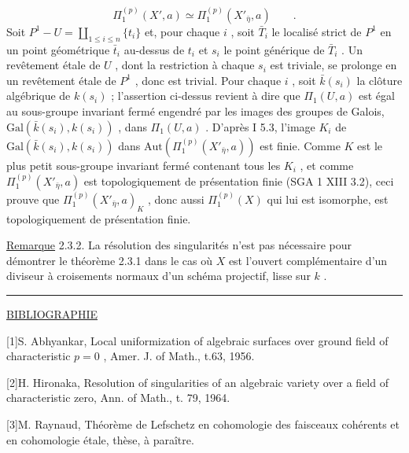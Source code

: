 \begin{equation*}
\Pi_1^{(p)}(X',a) \simeq \Pi_1^{(p)}(X'_{\bar{\eta}},a) \qquad .
\end{equation*}
Soit $P^1 - U = \coprod_{1\leqslant i\leqslant n} \{t_i\}$ et, pour chaque $i$ , soit $\bar{T}_i$ le localisé strict de $P^1$ en un point géométrique $\bar{t}_i$ au-dessus de $t_i$ et $s_i$ le point générique de $\bar{T}_i$ . Un revêtement étale de $U$ , dont la restriction à chaque $s_i$ est triviale, se prolonge en un revêtement étale de $P^1$ , donc est trivial. Pour chaque $i$ , soit $\bar{k}(s_i)$ la clôture algébrique de $k(s_i)$ ; l'assertion ci-dessus revient à dire que $\Pi_1(U,a)$ est égal au sous-groupe invariant fermé engendré par les images des groupes de Galois, $\mathrm{Gal}(\bar{k}(s_i),k(s_i))$ , dans $\Pi_1(U,a)$ . D'après I 5.3, l'image $K_i$ de $\mathrm{Gal}(\bar{k}(s_i),k(s_i))$ dans $\mathrm{Aut}(\Pi_1^{(p)}(X'_{\bar{\eta}},a))$ est finie. Comme $K$ est le plus petit sous-groupe invariant fermé contenant tous les $K_i$ , et comme $\Pi_1^{(p)}(X'_{\bar{\eta}},a)$ est topologiquement de présentation finie (SGA 1 XIII 3.2), ceci prouve que $\Pi_1^{(p)}(X'_{\bar{\eta}},a)_K$ , donc aussi $\Pi_1^{(p)}(X)$ qui lui est isomorphe, est topologiquement de présentation finie.



\underline{Remarque} 2.3.2.  La résolution des singularités n'est pas nécessaire pour démontrer le théorème 2.3.1 dans le cas où  $X$  est l'ouvert complémentaire d'un diviseur à croisements normaux d'un schéma projectif, lisse sur  $k$ .

\begin{center}\rule{1.5cm}{0.4pt}\end{center}

\underline{BIBLIOGRAPHIE}

[1]\quad S. Abhyankar, Local uniformization of algebraic surfaces over ground field of characteristic  $p = 0$ , Amer. J. of Math., t.63, 1956.

[2]\quad H. Hironaka, Resolution of singularities of an algebraic variety over a field of characteristic zero, Ann. of Math., t. 79, 1964.

[3]\quad M. Raynaud, Théorème de Lefschetz en cohomologie des faisceaux cohérents et en cohomologie étale, thèse, à paraître.

